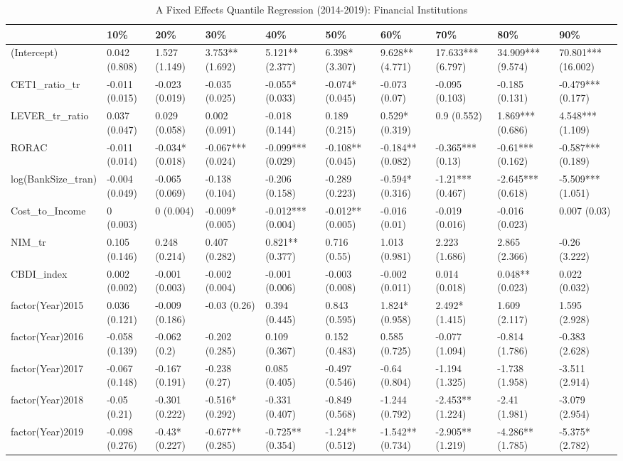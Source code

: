 \begin{table}[ht]
\centering
\caption{A Fixed Effects Quantile Regression (2014-2019): Financial Institutions} 
\begingroup\small
\begin{tabular}{llllllllll}
  \toprule
 & 10\% & 20\% & 30\% & 40\% & 50\% & 60\% & 70\% & 80\% & 90\% \\ 
  \midrule
(Intercept) & 0.042 (0.808) & 1.527 (1.149) & 3.753** (1.692) & 5.121** (2.377) & 6.398* (3.307) & 9.628** (4.771) & 17.633*** (6.797) & 34.909*** (9.574) & 70.801*** (16.002) \\ 
  CET1\_ratio\_tr & -0.011 (0.015) & -0.023 (0.019) & -0.035 (0.025) & -0.055* (0.033) & -0.074* (0.045) & -0.073 (0.07) & -0.095 (0.103) & -0.185 (0.131) & -0.479*** (0.177) \\ 
  LEVER\_tr\_ratio & 0.037 (0.047) & 0.029 (0.058) & 0.002 (0.091) & -0.018 (0.144) & 0.189 (0.215) & 0.529* (0.319) & 0.9 (0.552) & 1.869*** (0.686) & 4.548*** (1.109) \\ 
  RORAC & -0.011 (0.014) & -0.034* (0.018) & -0.067*** (0.024) & -0.099*** (0.029) & -0.108** (0.045) & -0.184** (0.082) & -0.365*** (0.13) & -0.61*** (0.162) & -0.587*** (0.189) \\ 
  log(BankSize\_tran) & -0.004 (0.049) & -0.065 (0.069) & -0.138 (0.104) & -0.206 (0.158) & -0.289 (0.223) & -0.594* (0.316) & -1.21*** (0.467) & -2.645*** (0.618) & -5.509*** (1.051) \\ 
  Cost\_to\_Income & 0 (0.003) & 0 (0.004) & -0.009* (0.005) & -0.012*** (0.004) & -0.012** (0.005) & -0.016 (0.01) & -0.019 (0.016) & -0.016 (0.023) & 0.007 (0.03) \\ 
  NIM\_tr & 0.105 (0.146) & 0.248 (0.214) & 0.407 (0.282) & 0.821** (0.377) & 0.716 (0.55) & 1.013 (0.981) & 2.223 (1.686) & 2.865 (2.366) & -0.26 (3.222) \\ 
  CBDI\_index & 0.002 (0.002) & -0.001 (0.003) & -0.002 (0.004) & -0.001 (0.006) & -0.003 (0.008) & -0.002 (0.011) & 0.014 (0.018) & 0.048** (0.023) & 0.022 (0.032) \\ 
  factor(Year)2015 & 0.036 (0.121) & -0.009 (0.186) & -0.03 (0.26) & 0.394 (0.445) & 0.843 (0.595) & 1.824* (0.958) & 2.492* (1.415) & 1.609 (2.117) & 1.595 (2.928) \\ 
  factor(Year)2016 & -0.058 (0.139) & -0.062 (0.2) & -0.202 (0.285) & 0.109 (0.367) & 0.152 (0.483) & 0.585 (0.725) & -0.077 (1.094) & -0.814 (1.786) & -0.383 (2.628) \\ 
  factor(Year)2017 & -0.067 (0.148) & -0.167 (0.191) & -0.238 (0.27) & 0.085 (0.405) & -0.497 (0.546) & -0.64 (0.804) & -1.194 (1.325) & -1.738 (1.958) & -3.511 (2.914) \\ 
  factor(Year)2018 & -0.05 (0.21) & -0.301 (0.222) & -0.516* (0.292) & -0.331 (0.407) & -0.849 (0.568) & -1.244 (0.792) & -2.453** (1.224) & -2.41 (1.981) & -3.079 (2.954) \\ 
  factor(Year)2019 & -0.098 (0.276) & -0.43* (0.227) & -0.677** (0.285) & -0.725** (0.354) & -1.24** (0.512) & -1.542** (0.734) & -2.905** (1.219) & -4.286** (1.785) & -5.375* (2.782) \\ 
   \bottomrule
\end{tabular}
\endgroup
\end{table}
